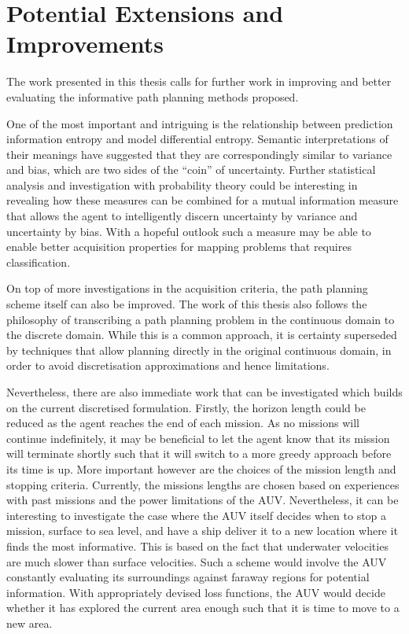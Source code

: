 	\section{Potential Extensions and Improvements}
	
		The work presented in this thesis calls for further work in improving and better evaluating the informative path planning methods proposed.
		
		One of the most important and intriguing is the relationship between prediction information entropy and model differential entropy. Semantic interpretations of their meanings have suggested that they are correspondingly similar to variance and bias, which are two sides of the ``coin'' of uncertainty. Further statistical analysis and investigation with probability theory could be interesting in revealing how these measures can be combined for a mutual information measure that allows the agent to intelligently discern uncertainty by variance and uncertainty by bias. With a hopeful outlook such a measure may be able to enable better acquisition properties for mapping problems that requires classification.
		
		On top of more investigations in the acquisition criteria, the path planning scheme itself can also be improved. The work of this thesis also follows the philosophy of transcribing a path planning problem in the continuous domain to the discrete domain. While this is a common approach, it is certainty superseded by techniques that allow planning directly in the original continuous domain, in order to avoid discretisation approximations and hence limitations. 
		
		Nevertheless, there are also immediate work that can be investigated which builds on the current discretised formulation. Firstly, the horizon length could be reduced as the agent reaches the end of each mission. As no missions will continue indefinitely, it may be beneficial to let the agent know that its mission will terminate shortly such that it will switch to a more greedy approach before its time is up. More important however are the choices of the mission length and stopping criteria. Currently, the missions lengths are chosen based on experiences with past missions and the power limitations of the AUV. Nevertheless, it can be interesting to investigate the case where the AUV itself decides when to stop a mission, surface to sea level, and have a ship deliver it to a new location where it finds the most informative. This is based on the fact that underwater velocities are much slower than surface velocities. Such a scheme would involve the AUV constantly evaluating its surroundings against faraway regions for potential information. With appropriately devised loss functions, the AUV would decide whether it has explored the current area enough such that it is time to move to a new area.
			
